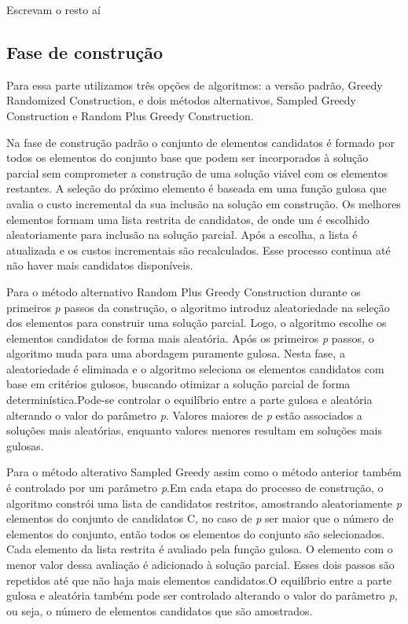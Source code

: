 \documentclass{article}
\begin{document}
Escrevam o resto aí

\subsection{Fase de construção}

Para essa parte utilizamos três opções de algoritmos: a versão padrão, Greedy Randomized Construction, e dois métodos alternativos, Sampled Greedy Construction e Random Plus Greedy Construction.

Na fase de construção padrão o conjunto de elementos candidatos é formado por todos os elementos do conjunto base que podem ser incorporados à solução parcial sem comprometer a construção de uma solução viável com os elementos restantes. A seleção do próximo elemento é baseada em uma função gulosa que avalia o custo incremental da sua inclusão na solução em construção. Os melhores elementos formam uma lista restrita de candidatos, de onde um é escolhido aleatoriamente para inclusão na solução parcial. Após a escolha, a lista é atualizada e os custos incrementais são recalculados. Esse processo continua até não haver mais candidatos disponíveis.

Para o método alternativo Random Plus Greedy Construction  durante os primeiros \textit{p} passos da construção, o algoritmo introduz aleatoriedade na seleção dos elementos para construir uma solução parcial. Logo, o algoritmo escolhe os elementos candidatos de forma mais aleatória. Após os primeiros \textit{p} passos, o algoritmo muda para uma abordagem puramente gulosa. Nesta fase, a aleatoriedade é eliminada e o algoritmo seleciona os elementos candidatos com base em critérios gulosos, buscando otimizar a solução parcial de forma determinística.Pode-se controlar o equilíbrio entre a parte gulosa e aleatória alterando o valor do parâmetro \textit{p}. Valores maiores de \textit{p} estão associados a soluções mais aleatórias, enquanto valores menores resultam em soluções mais gulosas.

Para o método alterativo Sampled Greedy assim como o método anterior também é  controlado por um parâmetro \textit{p}.Em cada etapa do processo de construção, o algoritmo constrói uma lista de candidatos restritos, amostrando aleatoriamente \textit{p} elementos do conjunto de candidatos C, no caso de \textit{p} ser maior que o número de elementos do conjunto, então todos os elementos do conjunto são selecionados. Cada elemento da lista restrita é avaliado pela função gulosa. O elemento com o menor valor dessa avaliação é adicionado à solução parcial. Esses dois passos são repetidos até que não haja mais elementos candidatos.O equilíbrio entre a parte gulosa e aleatória também pode ser controlado alterando o valor do parâmetro \textit{p}, ou seja, o número de elementos candidatos que são amostrados.
\end{document}
